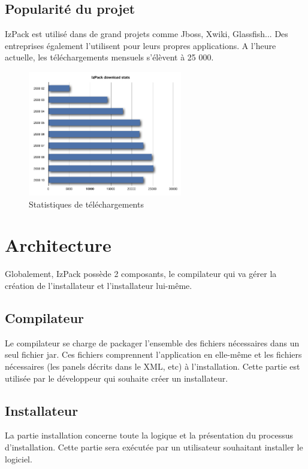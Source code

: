 \subsection{Popularité du projet}
IzPack est utilisé dans de grand projets comme Jboss, Xwiki, Glassfish... Des entreprises également l'utilisent pour leurs propres applications. A l'heure actuelle, les téléchargements mensuels s'élèvent à 25 000.
\begin{figure}[H]
	\centering
	\includegraphics[width=0.6\textwidth]{../image/telechargements.png}
	\caption{Statistiques de téléchargements}
\end{figure}
\section{Architecture}
Globalement, IzPack possède 2 composants, le compilateur qui va gérer la création de l'installateur et l'installateur lui-même.

\subsection{Compilateur}
Le compilateur se charge de packager l'ensemble des fichiers nécessaires dans un seul fichier jar.
Ces fichiers comprennent l'application en elle-même et les fichiers nécessaires (les panels décrits dans le XML, etc) à l'installation.
Cette partie est utilisée par le développeur qui souhaite créer un installateur.

\subsection{Installateur}
La partie installation concerne toute la logique et la présentation du processus d'installation. Cette partie sera exécutée par un utilisateur souhaitant installer le logiciel.

